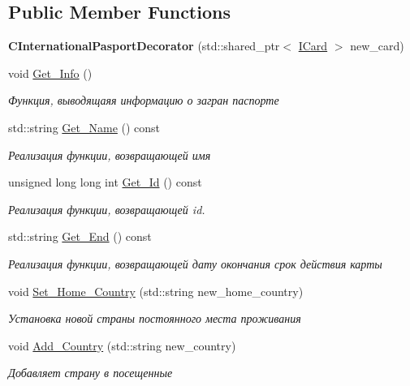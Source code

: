 \subsection*{Public Member Functions}
\begin{DoxyCompactItemize}
\item 
{\bfseries C\+International\+Pasport\+Decorator} (std\+::shared\+\_\+ptr$<$ \hyperlink{classICard}{I\+Card} $>$ new\+\_\+card)\hypertarget{classCInternationalPasportDecorator_a80bc080c1ff4debacb4400d1d3daa37a}{}\label{classCInternationalPasportDecorator_a80bc080c1ff4debacb4400d1d3daa37a}

\item 
void \hyperlink{classCInternationalPasportDecorator_a5f9edcd04ea9b5c4f845e28d98baf558}{Get\+\_\+\+Info} ()
\begin{DoxyCompactList}\small\item\em Функция, выводящаяя информацию о загран паспорте \end{DoxyCompactList}\item 
std\+::string \hyperlink{classCInternationalPasportDecorator_a03e853349bc53e7d393c1afbf8820a03}{Get\+\_\+\+Name} () const 
\begin{DoxyCompactList}\small\item\em Реализация функции, возвращающей имя \end{DoxyCompactList}\item 
unsigned long long int \hyperlink{classCInternationalPasportDecorator_a22b81d60c1174a2afeedb0f5870c79d7}{Get\+\_\+\+Id} () const 
\begin{DoxyCompactList}\small\item\em Реализация функции, возвращающей id. \end{DoxyCompactList}\item 
std\+::string \hyperlink{classCInternationalPasportDecorator_a3e5ea260b74f145373f529fdce92b7b0}{Get\+\_\+\+End} () const 
\begin{DoxyCompactList}\small\item\em Реализация функции, возвращающей дату окончания срок действия карты \end{DoxyCompactList}\item 
void \hyperlink{classCInternationalPasportDecorator_ab33808acddca7c90298af3e2263c57f3}{Set\+\_\+\+Home\+\_\+\+Country} (std\+::string new\+\_\+home\+\_\+country)
\begin{DoxyCompactList}\small\item\em Установка новой страны постоянного места проживания \end{DoxyCompactList}\item 
void \hyperlink{classCInternationalPasportDecorator_a5c2eb64545a378881deefe39c82b8cdd}{Add\+\_\+\+Country} (std\+::string new\+\_\+country)
\begin{DoxyCompactList}\small\item\em Добавляет страну в посещенные \end{DoxyCompactList}\end{DoxyCompactItemize}


